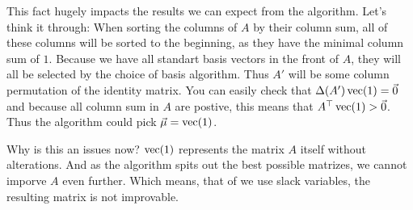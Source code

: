 This fact hugely impacts the results we can expect from the algorithm. Let's think it through: When sorting the columns of $A$ by their column sum, all of these columns will be sorted to the beginning, as they have the minimal column sum of $1$. Because we have all standart basis vectors in the front of $A$, they will all be selected by the choice of basis algorithm. Thus $A'$ will be some column permutation of the identity matrix. You can easily check that $\Delta(A')\operatorname{vec}(1) = \vec 0$ and because all column sum in $A$ are postive, this means that $A^\top \operatorname{vec}(1) > \vec 0$. Thus the algorithm could pick $\vec\mu = \operatorname{vec}(1)$.

Why is this an issues now? $\operatorname{vec}(1)$ represents the matrix $A$ itself without alterations. And as the algorithm spits out the best possible matrizes, we cannot imporve $A$ even further. Which means, that of we use slack variables, the resulting matrix is not improvable.